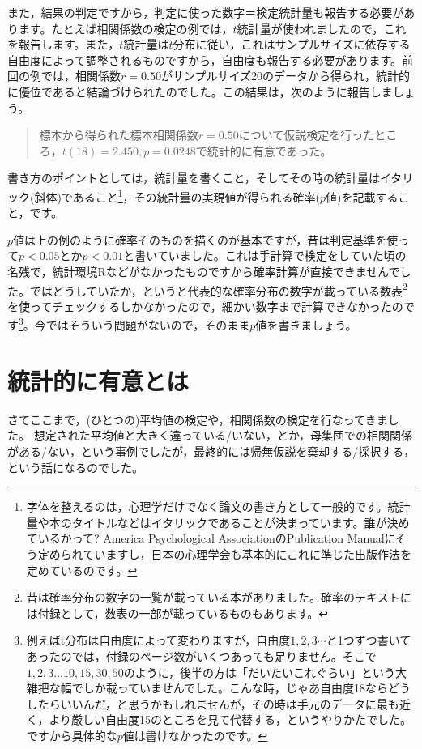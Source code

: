 \documentclass{ltjsarticle}
\begin{document}
また，結果の判定ですから，判定に使った数字＝検定統計量も報告する必要があります。たとえば相関係数の検定の例では，$t$統計量が使われましたので，これを報告します。また，$t$統計量は$t$分布に従い，これはサンプルサイズに依存する自由度によって調整されるものですから，自由度も報告する必要があります。前回の例では，相関係数$r=0.50$がサンプルサイズ20のデータから得られ，統計的に優位であると結論づけられたのでした。この結果は，次のように報告しましょう。
\begin{quote}
標本から得られた標本相関係数$r=0.50$について仮説検定を行ったところ，$t(18)=2.450,p=0.0248$で統計的に有意であった。
\end{quote}
書き方のポイントとしては，統計量を書くこと，そしてその時の統計量はイタリック(斜体)であること\footnote{字体を整えるのは，心理学だけでなく論文の書き方として一般的です。統計量や本のタイトルなどはイタリックであることが決まっています。誰が決めているかって? America Psychological AssociationのPublication Manualにそう定められていますし，日本の心理学会も基本的にこれに準じた出版作法を定めているのです。}，その統計量の実現値が得られる確率($p$値)を記載すること，です。

$p$値は上の例のように確率そのものを描くのが基本ですが，昔は判定基準を使って$p<0.05$とか$p<0.01$と書いていました。これは手計算で検定をしていた頃の名残で，統計環境Rなどがなかったものですから確率計算が直接できませんでした。ではどうしていたか，というと代表的な確率分布の数字が載っている数表\footnote{昔は確率分布の数字の一覧が載っている本がありました。確率のテキストには付録として，数表の一部が載っているものもあります。}を使ってチェックするしかなかったので，細かい数字まで計算できなかったのです\footnote{例えばt分布は自由度によって変わりますが，自由度$1,2,3\cdots$と1つずつ書いてあったのでは，付録のページ数がいくつあっても足りません。そこで$1,2,3...10,15,30,50$のように，後半の方は「だいたいこれぐらい」という大雑把な幅でしか載っていませんでした。こんな時，じゃあ自由度18ならどうしたらいいんだ，と思うかもしれませんが，その時は手元のデータに最も近く，より厳しい自由度15のところを見て代替する，というやりかたでした。ですから具体的な$p$値は書けなかったのです。}。今ではそういう問題がないので，そのまま$p$値を書きましょう。

\section{統計的に有意とは}
\label{statistical_significant}
さてここまで，(ひとつの)平均値の検定や，相関係数の検定を行なってきました。
想定された平均値と大きく違っている/いない，とか，母集団での相関関係がある/ない，という事例でしたが，最終的には帰無仮説を棄却する/採択する，という話になるのでした。
\end{document}
